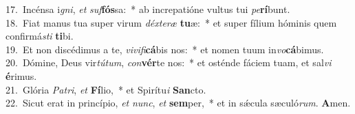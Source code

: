 {17.~}Incénsa i\textit{gni}, \textit{et} \textit{suf}\textbf{fós}sa:~* ab increpatióne vultus tui \textit{pe}\textbf{rí}bunt.\\
{18.~}Fiat manus tua super virum \textit{déx}\textit{te}\textit{ræ} \textbf{tu}æ:~* et super fílium hóminis quem confirmá\textit{sti} \textbf{ti}bi.\\
{19.~}Et non discédimus a te, \textit{vi}\textit{vi}\textit{fi}\textbf{cá}bis nos:~* et nomen tuum in\textit{vo}\textbf{cá}bimus.\\
{20.~}Dómine, Deus vir\textit{tú}\textit{tum}, \textit{con}\textbf{vér}te nos:~* et osténde fáciem tuam, et sal\textit{vi} \textbf{é}rimus.\\
{21.~}Glória \textit{Pa}\textit{tri}, \textit{et} \textbf{Fí}lio,~* et Spirítu\textit{i} \textbf{San}cto.\\
{22.~}Sicut erat in princípio, \textit{et} \textit{nunc}, \textit{et} \textbf{sem}per,~* et in sǽcula sæculó\textit{rum}. \textbf{A}men.\\
